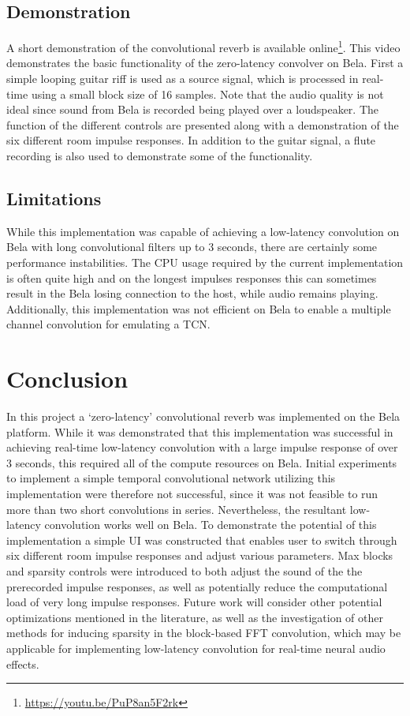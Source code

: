 \documentclass{article}
\begin{document}
\subsection{Demonstration}

A short demonstration of the convolutional reverb is available online\footnote{\url{https://youtu.be/PuP8an5F2rk}}.
This video demonstrates the basic functionality of the zero-latency convolver on Bela.
First a simple looping guitar riff is used as a source signal, 
which is processed in real-time using a small block size of 16 samples. 
Note that the audio quality is not ideal since sound from Bela is recorded being played over a loudspeaker.
The function of the different controls are presented along with a demonstration of the six different room impulse responses. 
In addition to the guitar signal, a flute recording is also used to demonstrate some of the functionality. 

\subsection{Limitations}
While this implementation was capable of achieving a low-latency convolution on Bela with long convolutional filters up to 3 seconds, 
there are certainly some performance instabilities. 
The CPU usage required by the current implementation is often quite high and on the longest impulses responses 
this can sometimes result in the Bela losing connection to the host, while audio remains playing. 
Additionally, this implementation was not efficient on Bela to enable a multiple channel convolution for emulating a TCN. 

\section{Conclusion}\label{sec:conclusion}

In this project a `zero-latency' convolutional reverb was implemented on the Bela platform.
While it was demonstrated that this implementation was successful in achieving real-time low-latency convolution 
with a large impulse response of over 3 seconds, this required all of the compute resources on Bela. 
Initial experiments to implement a simple temporal convolutional network utilizing this implementation 
were therefore not successful, since it was not feasible to run more than two short convolutions in series.
Nevertheless, the resultant low-latency convolution works well on Bela. 
To demonstrate the potential of this implementation a simple UI was constructed that enables user
to switch through six different room impulse responses and adjust various parameters.
Max blocks and sparsity controls were introduced to both adjust the sound of the the prerecorded impulse responses, 
as well as potentially reduce the computational load of very long impulse responses. 
Future work will consider other potential optimizations mentioned in the literature, 
as well as the investigation of other methods for inducing sparsity in the block-based FFT convolution, 
which may be applicable for implementing low-latency convolution for real-time neural audio effects. 

\cleardoublepage


\end{document}
